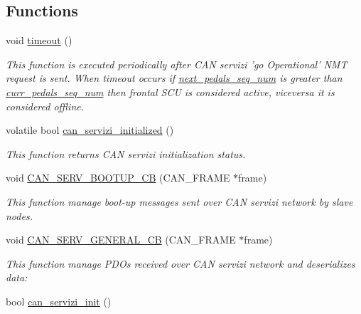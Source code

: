 \subsection*{Functions}
\begin{DoxyCompactItemize}
\item 
void \hyperlink{group___c_a_n__servizi__group_gad446b5782bcb2d8ffc0aa1f8c4d16ded}{timeout} ()
\begin{DoxyCompactList}\small\item\em This function is executed periodically after C\-A\-N servizi 'go Operational' N\-M\-T request is sent. When timeout occurs if \hyperlink{group___c_a_n__servizi__group_gadcbd4ad67b50cf61731266bf5c5ba158}{next\-\_\-pedals\-\_\-seq\-\_\-num} is greater than \hyperlink{group___c_a_n__servizi__group_gacad002b7cb06bffa8811859e6f53cb28}{curr\-\_\-pedals\-\_\-seq\-\_\-num} then frontal S\-C\-U is considered active, viceversa it is considered offline. \end{DoxyCompactList}\item 
volatile bool \hyperlink{group___c_a_n__servizi__group_gaa460928ec03256a076ebafceab10c2be}{can\-\_\-servizi\-\_\-initialized} ()
\begin{DoxyCompactList}\small\item\em This function returns C\-A\-N servizi initialization status. \end{DoxyCompactList}\item 
void \hyperlink{group___c_a_n__servizi__group_gaab9a1dbabaf97e474f5597e8b2a02c6e}{C\-A\-N\-\_\-\-S\-E\-R\-V\-\_\-\-B\-O\-O\-T\-U\-P\-\_\-\-C\-B} (C\-A\-N\-\_\-\-F\-R\-A\-M\-E $\ast$frame)
\begin{DoxyCompactList}\small\item\em This function manage boot-\/up messages sent over C\-A\-N servizi network by slave nodes. \end{DoxyCompactList}\item 
void \hyperlink{group___c_a_n__servizi__group_ga5897a28288e24aa5131ff5b81f5fedc8}{C\-A\-N\-\_\-\-S\-E\-R\-V\-\_\-\-G\-E\-N\-E\-R\-A\-L\-\_\-\-C\-B} (C\-A\-N\-\_\-\-F\-R\-A\-M\-E $\ast$frame)
\begin{DoxyCompactList}\small\item\em This function manage P\-D\-Os received over C\-A\-N servizi network and deserializes data\-: \end{DoxyCompactList}\item 
bool \hyperlink{group___c_a_n__servizi__group_ga2d29bd107e96ae1986e8874f004ffc84}{can\-\_\-servizi\-\_\-init} ()

\end{DoxyCompactItemize}
